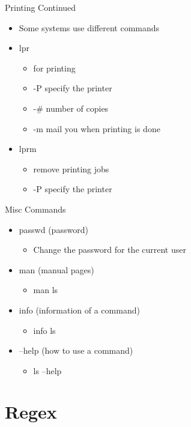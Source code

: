 \documentclass{beamer}
\begin{document}
\begin{frame}{Printing Continued}
\begin{itemize}
\item Some systems use different commands
\item lpr
\begin{itemize}
\item for printing
\item -P specify the printer
\item -\# number of copies
\item -m mail you when printing is done
\end{itemize}
\item lprm
\begin{itemize}
\item remove printing jobs
\item -P specify the printer
\end{itemize}
\end{itemize}
\end{frame}

\begin{frame}{Misc Commands}
\begin{itemize}
\item passwd (password)
\begin{itemize}
\item Change the password for the current user
\end{itemize}
\item man (manual pages)
\begin{itemize}
\item man ls
\end{itemize}
\item info (information of a command)
\begin{itemize}
\item info ls
\end{itemize}
\item --help (how to use a command)
\begin{itemize}
\item ls --help
\end{itemize}
\end{itemize}
\end{frame}

\section{Regex}
\subsection{}
\end{document}
